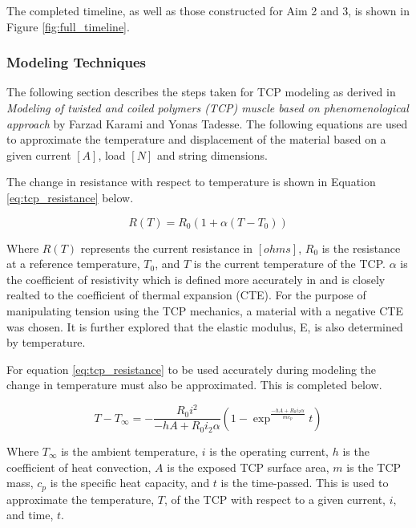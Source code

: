 		The completed timeline, as well as those constructed for Aim 2 and 3, is shown in Figure \ref{fig:full_timeline}.

	\subsubsection{Modeling Techniques}
	\label{sect:aim1_modeling_techniques}
	
		The following section describes the steps taken for TCP modeling as derived in \textit{Modeling of twisted and coiled polymers (TCP) muscle based on phenomenological approach} by Farzad Karami and Yonas Tadesse. The following equations are used to approximate the temperature and displacement of the material based on a given current $[A]$, load $[N]$ and string dimensions.

		The change in resistance with respect to temperature is shown in Equation \ref{eq:tcp_resistance} below.
	
		\begin{equation}
		\label{eq:tcp_resistance}
			R(T) = R_{0} (1 + \alpha (T - T_{0}))
		\end{equation}
	
		Where $R(T)$ represents the current resistance in $[ohms]$, $R_{0}$ is the resistance at a reference temperature, $T_{0}$, and $T$ is the current temperature of the TCP. $\alpha$ is the coefficient of resistivity which is defined more accurately in \cite{yang_top-down_2016} and is closely realted to the coefficient of thermal expansion (CTE). For the purpose of manipulating tension using the TCP mechanics, a material with a negative CTE was chosen. It is further explored that the elastic modulus, E, is also determined by temperature.
	
		For equation \ref{eq:tcp_resistance} to be used accurately during modeling the change in temperature must also be approximated. This is completed below.
	
		\begin{equation}
		\label{eq:tcp_temperature}
			T - T_{\infty} =
				- \frac{R_{0} i^{2}}{-h A + R_{0} i_{2} \alpha}
				\left(
					1 -
					\exp^{\frac{-h A + R_{0} i_{2} \alpha}{m c_{p}}} t
				\right)
		\end{equation}
	
		Where $T_{\infty}$ is the ambient temperature, $i$ is the operating current, $h$ is the coefficient of heat convection, $A$ is the exposed TCP surface area, $m$ is the TCP mass, $c_{p}$ is the specific heat capacity, and $t$ is the time-passed. This is used to approximate the temperature, $T$, of the TCP with respect to a given current, $i$, and time, $t$.
	
